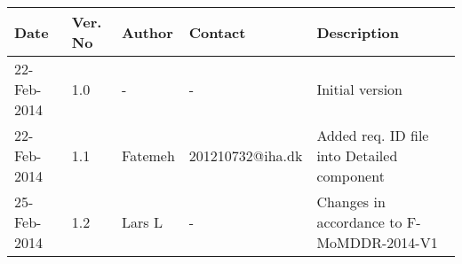 \begin{center}
    \begin{tabular}{ | l | p{1cm} | l | l | p{5cm} |}
    \hline
    Date&Ver. No & Author &Contact &Description\\ \hline
	22-Feb-2014&1.0 & - & - & Initial version\\
    \hline
    	22-Feb-2014&1.1 & Fatemeh & 201210732@iha.dk & Added req. ID file into Detailed component \\
    \hline
    25-Feb-2014&1.2 & Lars L & - & Changes in accordance to F-MoMDDR-2014-V1\\
    \hline
    \end{tabular}
\end{center}